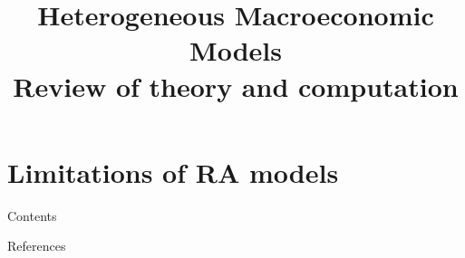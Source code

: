 \documentclass[10pt,aspectratio=43]{beamer}
\title{{Heterogeneous Macroeconomic Models} \\ \Large Review of theory and computation}
\begin{document}
\begin{frame}[fragile]
    \titlepage
\end{frame}



\section{Limitations of RA models}
\begin{frame}[fragile]{Contents}
    \large
    \tableofcontents[currentsection]
\end{frame}



\begin{frame}[allowframebreaks]{References}
    \renewcommand*{\bibfont}{\scriptsize}
    \printbibliography
\end{frame}
\end{document}
